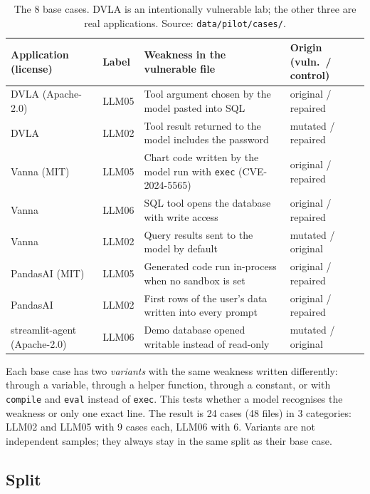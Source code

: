 \documentclass[11pt,a4paper]{article}
\newcommand{\code}[1]{\texttt{#1}}
\begin{document}
\begin{table}[H]
\centering\small
\begin{tabularx}{\linewidth}{>{\raggedright\arraybackslash}p{3.1cm} >{\raggedright\arraybackslash}p{1.1cm} >{\raggedright\arraybackslash}X >{\raggedright\arraybackslash}p{2.6cm}}
\toprule
Application (license) & Label & Weakness in the vulnerable file & Origin (vuln.\ / control) \\
\midrule
DVLA (Apache-2.0) & LLM05 & Tool argument chosen by the model pasted into SQL & original / repaired \\
DVLA & LLM02 & Tool result returned to the model includes the password & mutated / repaired \\
Vanna (MIT) & LLM05 & Chart code written by the model run with \code{exec} (CVE-2024-5565) & original / repaired \\
Vanna & LLM06 & SQL tool opens the database with write access & original / repaired \\
Vanna & LLM02 & Query results sent to the model by default & mutated / original \\
PandasAI (MIT) & LLM05 & Generated code run in-process when no sandbox is set & original / repaired \\
PandasAI & LLM02 & First rows of the user's data written into every prompt & original / repaired \\
streamlit-agent (Apache-2.0) & LLM06 & Demo database opened writable instead of read-only & mutated / original \\
\bottomrule
\end{tabularx}
\caption{The 8 base cases. DVLA is an intentionally vulnerable lab; the other three are
real applications. Source: \code{data/pilot/cases/}.}
\label{tab:appcases}
\end{table}

Each base case has two \emph{variants} with the same weakness written differently: through
a variable, through a helper function, through a constant, or with \code{compile} and
\code{eval} instead of \code{exec}. This tests whether a model recognises the weakness or
only one exact line. The result is 24 cases (48 files) in 3 categories: LLM02 and LLM05
with 9 cases each, LLM06 with 6. Variants are not independent samples; they always stay
in the same split as their base case.

\subsection{Split}
\end{document}
